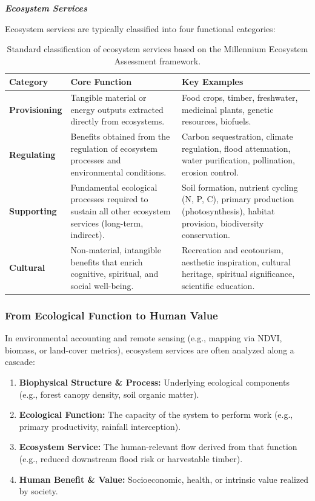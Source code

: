 \documentclass[12pt, letterpaper]{article}
\begin{document}
\bigskip
\LARGE
\begin{flushleft}
\textbf{\textit{Ecosystem Services}}
\end{flushleft}
\normalsize

Ecosystem services are typically classified into four functional categories:

\begin{table}[h!]
\centering
\renewcommand{\arraystretch}{1.35}
\begin{tabularx}{\textwidth}{>{\bfseries}l X X}
\toprule
Category & Core Function & Key Examples \\
\midrule
Provisioning & Tangible material or energy outputs extracted directly from ecosystems. & Food crops, timber, freshwater, medicinal plants, genetic resources, biofuels. \\
Regulating & Benefits obtained from the regulation of ecosystem processes and environmental conditions. & Carbon sequestration, climate regulation, flood attenuation, water purification, pollination, erosion control. \\
Supporting & Fundamental ecological processes required to sustain all other ecosystem services (long-term, indirect). & Soil formation, nutrient cycling (N, P, C), primary production (photosynthesis), habitat provision, biodiversity conservation. \\
Cultural & Non-material, intangible benefits that enrich cognitive, spiritual, and social well-being. & Recreation and ecotourism, aesthetic inspiration, cultural heritage, spiritual significance, scientific education. \\
\bottomrule
\end{tabularx}
\caption{Standard classification of ecosystem services based on the Millennium Ecosystem Assessment framework.}
\end{table}

\subsubsection*{From Ecological Function to Human Value}
In environmental accounting and remote sensing (e.g., mapping via NDVI, biomass, or land-cover metrics), ecosystem services are often analyzed along a cascade:
\begin{enumerate}
    \item \textbf{Biophysical Structure \& Process:} Underlying ecological components (e.g., forest canopy density, soil organic matter).
    \item \textbf{Ecological Function:} The capacity of the system to perform work (e.g., primary productivity, rainfall interception).
    \item \textbf{Ecosystem Service:} The human-relevant flow derived from that function (e.g., reduced downstream flood risk or harvestable timber).
    \item \textbf{Human Benefit \& Value:} Socioeconomic, health, or intrinsic value realized by society.
\end{enumerate}
\end{document}
